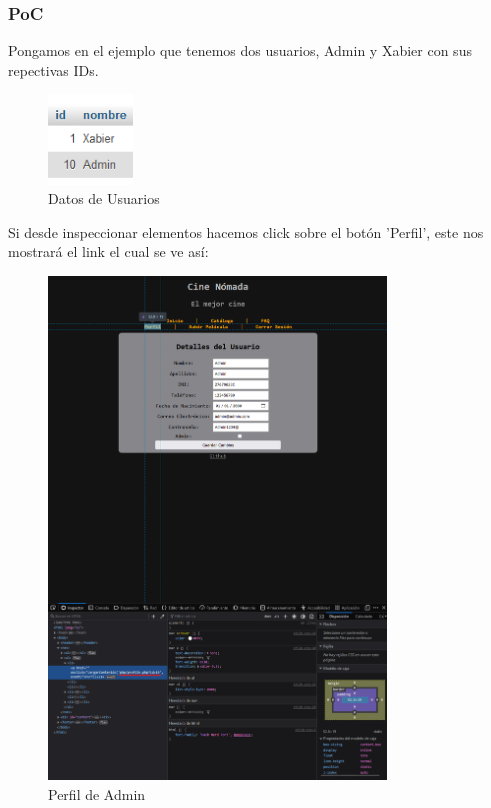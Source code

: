 \documentclass{report}
\begin{document}
                \subsubsection{PoC}
                    Pongamos en el ejemplo que tenemos dos usuarios, Admin y Xabier con sus repectivas IDs.
                    \begin{figure}[H]
                        \centering
                        \includegraphics[width=0.2\textwidth]{./img/vulnerabilidades/3.1/1.1.png}
                        \caption{Datos de Usuarios}
                    \end{figure}
                    Si desde inspeccionar elementos hacemos click sobre el botón 'Perfil', este nos mostrará el link el cual se ve así:
                    \begin{figure}[H]
                        \centering
                        \includegraphics[width=0.8\textwidth]{./img/vulnerabilidades/3.1/1.2.png}
                        \caption{Perfil de Admin}
                    \end{figure}
\end{document}
